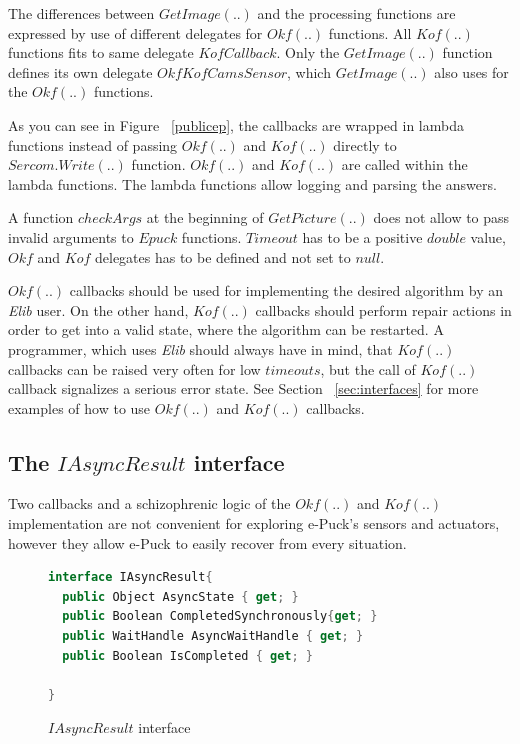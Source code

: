   The differences between $GetImage(..)$ and the processing functions are expressed by use of different
  delegates for $Okf(..)$ functions. All $Kof(..)$ functions fits to same delegate $KofCallback$. 
  Only the $GetImage(..)$ function defines its own delegate $OkfKofCamsSensor$, 
  which $GetImage(..)$ also uses for the $Okf(..)$ functions.

  As you can see in Figure ~\ref{publicep}, the callbacks are wrapped in lambda functions \cite{lambda}
  instead of passing $Okf(..)$ and $Kof(..)$ directly to $Sercom.Write(..)$ function.
  $Okf(..)$ and $Kof(..)$  are called within the lambda functions.
  The lambda functions allow logging and parsing the answers.

  A function $checkArgs$ at the beginning of $GetPicture(..)$ does not allow to pass invalid arguments
  to $Epuck$ functions. $Timeout$ has to be a positive $double$ value, $Okf$ and $Kof$ delegates 
  has to be defined and not set to $null$.

  $Okf(..)$ callbacks should be used for implementing the desired algorithm by an {\it Elib} user.
  On the other hand, $Kof(..)$ callbacks should perform repair actions in order to get into a valid state,
  where the algorithm can be restarted. A programmer, which uses {\it Elib} should always have in mind,
  that $Kof(..)$ callbacks can be raised very often for low $timeouts$,
  but the call of $Kof(..)$ callback signalizes a serious error state.
  See Section ~\ref{sec:interfaces} for more examples of how to use $Okf(..)$ and $Kof(..)$ callbacks.


\subsection{The $IAsyncResult$ interface} \label{sec:iasync}
  Two callbacks and a schizophrenic logic of the $Okf(..)$ and $Kof(..)$ implementation are not
  convenient for exploring e-Puck's sensors and actuators, 
  however they allow e-Puck to easily recover from every situation.

\begin{figure}[!hbp]
\begin{lstlisting}[language=cs]
interface IAsyncResult{
  public Object AsyncState { get; }
  public Boolean CompletedSynchronously{get; } 
  public WaitHandle AsyncWaitHandle { get; }
  public Boolean IsCompleted { get; }
  
}
\end{lstlisting}
\caption{$IAsyncResult$ interface}
\label{interface}
\end{figure}

